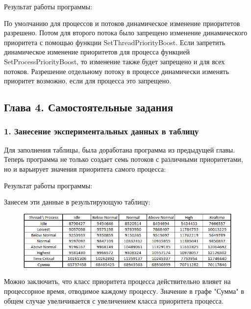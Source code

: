 \documentclass[14pt,a4paper,report]{report}
\begin{document}


Результат работы программы:



По умолчанию для процессов и потоков динамическое изменение приоритетов разрешено. Потом для второго потока было запрещено изменение динамического приоритета с помощью функции SetThreadPriorityBoost. Если запретить динамическое изменение приоритетов для процесса функцией SetProcessPriorityBoost, то изменение также будет запрещено и для всех потоков. Разрешение отдельному потоку в процессе динамически изменять приоритет возможно, если для процесса это запрещено.

\subsection{Глава 4. Самостоятельные задания}

\subsubsection{1. Занесение экспериментальных данных в таблицу}

Для заполнения таблицы, была доработана программа из предыдущей главы. Теперь программа не только создает семь потоков с различными приоритетами, но и варьирует значения приоритета самого процесса:



Результат работы программы:



\clearpage

Занесем эти данные в результирующую таблицу:

\begin{figure}[h!]
	\centering
	\includegraphics[scale = 0.95]{images/p4_1.png}
	
	\caption{}
	\label{image:5}
\end{figure}

Можно заключить, что класс приоритета процесса действительно влияет на процессорное время, отводимое каждому процессу. Значение в графе "Сумма" в общем случае увеличивается с увеличением класса приоритета процесса. 
\end{document}
